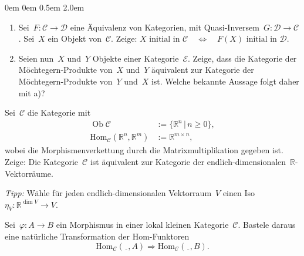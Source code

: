 \documentclass[a4paper,ngerman]{scrartcl}
\theoremstyle{definition}
\theoremstyle{plain}
\theoremstyle{remark}
\newcommand{\R}{\mathbb{R}}
\newcommand{\C}{\mathcal{C}}
\newcommand{\D}{\mathcal{D}}
\newcommand{\E}{\mathcal{E}}
\newcommand{\Hom}{\mathrm{Hom}}
\newcommand{\freist}{\underline{\ \ }}
\DeclareMathOperator{\Ob}{Ob}
\begin{document}
\begin{list}{}{0em \leftmargin0em \itemindent0.5em \itemsep 2.0em}
\item[\textbf{Aufgabe 2:}]\mbox{}
\begin{enumerate}
\item
Sei~$F : \C \to \D$ eine Äquivalenz von Kategorien, mit Quasi-Inversem~$G : \D
\to \C$. Sei~$X$ ein Objekt von~$\C$. Zeige:
$\text{$X$ initial in~$\C$} \quad\Longleftrightarrow\quad
  \text{$F(X)$ initial in~$\D$.}$
\item
Seien nun~$X$ und~$Y$ Objekte einer Kategorie~$\E$. Zeige, dass die Kategorie der
Möchtegern-Produkte von~$X$ und~$Y$ äquivalent zur Kategorie der
Möchtegern-Produkte von~$Y$ und~$X$ ist. Welche bekannte Aussage folgt daher
mit a)?
\end{enumerate}

\item[\textbf{Aufgabe 3:}]
Sei~$\C$ die Kategorie mit
\begin{align*}
  \Ob \C &:= \{ \R^n \,|\, n \geq 0 \}, \\
  \Hom_\C(\R^n, \R^m) &:= \R^{m \times n},
\end{align*}
wobei die Morphismenverkettung durch die Matrixmultiplikation gegeben ist.
Zeige: Die Kategorie~$\C$ ist äquivalent zur Kategorie der
endlich-dimensionalen~$\R$-Vektorräume.

\emph{Tipp:} Wähle für jeden endlich-dimensionalen Vektorraum~$V$ einen Iso
$\eta_V : \R^{\dim V} \to V$.

\item[\textbf{Projektaufgabe:}]
Sei~$\varphi : A \to B$ ein Morphismus in einer lokal kleinen Kategorie~$\C$.
Bastele daraus eine natürliche Transformation der Hom-Funktoren
\[ \Hom_\C(\freist, A) \Longrightarrow \Hom_\C(\freist, B). \]
\end{list}
\end{document}

